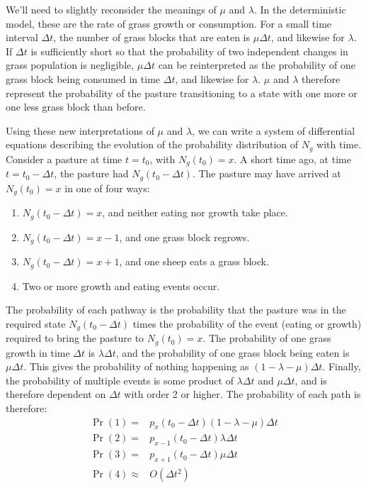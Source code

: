 \documentclass{article}
\theoremstyle{theorem}
\theoremstyle{definition}
\begin{document}
We'll need to slightly reconsider the meanings of $\mu$ and $\lambda$. In the deterministic model, these are the rate of grass growth or consumption. For a small time interval $\Delta t$, the number of grass blocks that are eaten is $\mu\Delta t$, and likewise for $\lambda$. If $\Delta t$ is sufficiently short so that the probability of two independent changes in grass population is negligible, $\mu\Delta t$ can be reinterpreted as the probability of one grass block being consumed in time $\Delta t$, and likewise for $\lambda$. $\mu$ and $\lambda$ therefore represent the probability of the pasture transitioning to a state with one more or one less grass block than before.

Using these new interpretations of $\mu$ and $\lambda$, we can write a system of differential equations describing the evolution of the probability distribution of $N_g$ with time. Consider a pasture at time $t=t_0$, with $N_g(t_0)=x$. A short time ago, at time $t=t_0-\Delta t$, the pasture had $N_g(t_0-\Delta t)$. The pasture may have arrived at $N_g(t_0)=x$ in one of four ways:

\begin{enumerate}
    \item $N_g(t_0-\Delta t)=x$, and neither eating nor growth take place.
    \item $N_g(t_0-\Delta t)=x-1$, and one grass block regrows.
    \item $N_g(t_0-\Delta t)=x+1$, and one sheep eats a grass block.
    \item Two or more growth and eating events occur.
\end{enumerate}

The probability of each pathway is the probability that the pasture was in the required state $N_g(t_0-\Delta t)$ times the probability of the event (eating or growth) required to bring the pasture to $N_g(t_0)=x$. The probability of one grass growth in time $\Delta t$ is $\lambda\Delta t$, and the probability of one grass block being eaten is $\mu\Delta t$. This gives the probability of nothing happening as $(1-\lambda-\mu)\Delta t$. Finally, the probability of multiple events is some product of $\lambda\Delta t$ and $\mu\Delta t$, and is therefore dependent on $\Delta t$ with order 2 or higher. The probability of each path is therefore:
\begin{align*}
    \Pr(1)=&p_x(t_0-\Delta t)(1-\lambda-\mu)\Delta t\\
    \Pr(2)=&p_{x-1}(t_0-\Delta t)\lambda\Delta t\\
    \Pr(3)=&p_{x+1}(t_0-\Delta t)\mu\Delta t\\
    \Pr(4)\approx&O(\Delta t^2)\\
\end{align*}
\end{document}
